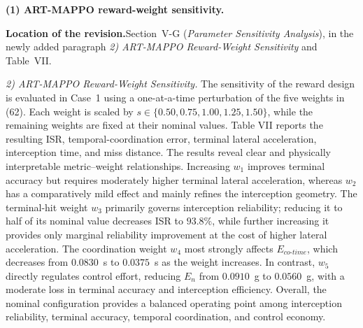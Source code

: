 \documentclass[11pt]{article}
\newcommand{\hladd}[1]{{\color{addblue}#1}}
\newcommand{\loc}{\medskip\noindent\textbf{Location of the revision.}\quad}
\begin{document}



\medskip
\noindent\textbf{(1) ART-MAPPO reward-weight sensitivity.}

\loc Section~V-G (\emph{Parameter Sensitivity Analysis}), in the newly added
paragraph \emph{2) ART-MAPPO Reward-Weight Sensitivity} and Table~VII.

\begin{tcolorbox}[enhanced,breakable,colback=white,colframe=addblue!55,
coltext=addblue,fontupper=\color{addblue},boxrule=0.6pt,arc=2pt,
left=9pt,right=9pt,top=7pt,bottom=7pt]
\hladd{\emph{2) ART-MAPPO Reward-Weight Sensitivity.}
The sensitivity of the reward design is evaluated in Case~1 using a
one-at-a-time perturbation of the five weights in
(62). Each weight is scaled by
$s\in\{0.50,0.75,1.00,1.25,1.50\}$, while the remaining weights are fixed at
their nominal values. Table VII reports the resulting
ISR, temporal-coordination error, terminal lateral acceleration, interception time, and
miss distance. The results reveal clear and physically interpretable
metric--weight relationships. Increasing $w_1$ improves terminal accuracy but
requires moderately higher terminal lateral acceleration, whereas $w_2$ has a comparatively
mild effect and mainly refines the interception geometry. The terminal-hit
weight $w_3$ primarily governs interception reliability; reducing it to half
of its nominal value decreases ISR to $93.8\%$, while further increasing it
provides only marginal reliability improvement at the cost of higher lateral acceleration.
The coordination weight $w_4$ most strongly affects
$E_{co\text{-}time}$, which decreases from $0.0830$~s to $0.0375$~s as the
weight increases. In contrast, $w_5$ directly regulates control effort,
reducing $E_n$ from $0.0910$~g to $0.0560$~g, with a moderate loss in terminal
accuracy and interception efficiency. Overall, the nominal configuration
provides a balanced operating point among interception reliability, terminal
accuracy, temporal coordination, and control economy.}


\end{tcolorbox}
\end{document}
